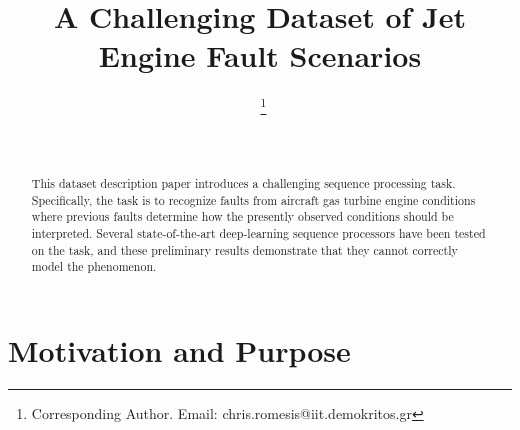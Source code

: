 \documentclass{ecai}
\begin{document}

\begin{frontmatter}




\title{A Challenging Dataset of Jet Engine Fault Scenarios}


\author[A]{~\thanks{Corresponding Author. Email: chris.romesis@iit.demokritos.gr}}
\author[A]{~}
\address[A]{Institute of Informatics and Telecommunications, NCSR Demokritos}



\begin{abstract}
  This dataset description paper introduces a challenging sequence
  processing task. Specifically, the task is to recognize faults from
  aircraft gas turbine engine conditions where previous faults
  determine how the presently observed conditions should be
  interpreted. Several state-of-the-art deep-learning sequence
  processors have been tested on the task, and these preliminary
  results demonstrate that they cannot correctly model the phenomenon.
\end{abstract}

\end{frontmatter}


\section{Motivation and Purpose}
\end{document}

